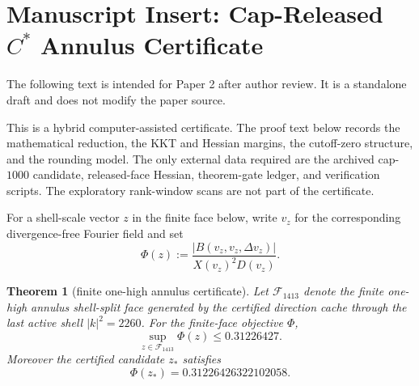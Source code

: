 \documentclass[11pt]{article}
\newtheorem{theorem}{Theorem}
\begin{document}
\section*{Manuscript Insert: Cap-Released \(C^*\) Annulus Certificate}

The following text is intended for Paper 2 after author review.  It is a
standalone draft and does not modify the paper source.

This is a hybrid computer-assisted certificate.  The proof text below records
the mathematical reduction, the KKT and Hessian margins, the cutoff-zero
structure, and the rounding model.  The only external data required are the
archived cap-\(1000\) candidate, released-face Hessian, theorem-gate ledger,
and verification scripts.  The exploratory rank-window scans are not part of
the certificate.

For a shell-scale vector \(z\) in the finite face below, write \(v_z\) for the
corresponding divergence-free Fourier field and set
\[
   \Phi(z):=\frac{|B(v_z,v_z,\Delta v_z)|}{X(v_z)^2D(v_z)}.
\]

\begin{theorem}[finite one-high annulus certificate]
\label{thm:cstar-annulus-cap1000}
Let \(\mathcal F_{1413}\) denote the finite one-high annulus shell-split face
generated by the certified direction cache through the last active shell
\(|k|^2=2260\).  For the finite-face objective \(\Phi\),
\[
   \sup_{z\in \mathcal F_{1413}} \Phi(z) \le 0.31226427 .
\]
Moreover the certified candidate \(z_*\) satisfies
\[
   \Phi(z_*) = 0.31226426322102058 .
\]
\end{theorem}
\end{document}
